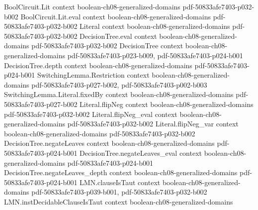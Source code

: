 \begin{theorem}
\label{BooleanAnalysis.fourier_coeff_chi}
\leanok
{}
\proofstep
  {BoolCircuit.Lit}
  {context}
  {boolean-ch08-generalized-domains}
  {pdf-50833afe7403-p032-b002}
\proofstep
  {BoolCircuit.Lit.eval}
  {context}
  {boolean-ch08-generalized-domains}
  {pdf-50833afe7403-p032-b002}
\proofstep
  {Literal}
  {context}
  {boolean-ch08-generalized-domains}
  {pdf-50833afe7403-p032-b002}
\proofstep
  {DecisionTree.eval}
  {context}
  {boolean-ch08-generalized-domains}
  {pdf-50833afe7403-p032-b002}
\proofstep
  {DecisionTree}
  {context}
  {boolean-ch08-generalized-domains}
  {pdf-50833afe7403-p023-b009,
    pdf-50833afe7403-p024-b001}
\proofstep
  {DecisionTree.depth}
  {context}
  {boolean-ch08-generalized-domains}
  {pdf-50833afe7403-p024-b001}
\proofstep
  {SwitchingLemma.Restriction}
  {context}
  {boolean-ch08-generalized-domains}
  {pdf-50833afe7403-p027-b002,
    pdf-50833afe7403-p002-b003}
\proofstep
  {SwitchingLemma.Literal.fixedBy}
  {context}
  {boolean-ch08-generalized-domains}
  {pdf-50833afe7403-p027-b002}
\proofstep
  {Literal.flipNeg}
  {context}
  {boolean-ch08-generalized-domains}
  {pdf-50833afe7403-p032-b002}
\proofstep
  {Literal.flipNeg_eval}
  {context}
  {boolean-ch08-generalized-domains}
  {pdf-50833afe7403-p032-b002}
\proofstep
  {Literal.flipNeg_var}
  {context}
  {boolean-ch08-generalized-domains}
  {pdf-50833afe7403-p032-b002}
\proofstep
  {DecisionTree.negateLeaves}
  {context}
  {boolean-ch08-generalized-domains}
  {pdf-50833afe7403-p024-b001}
\proofstep
  {DecisionTree.negateLeaves_eval}
  {context}
  {boolean-ch08-generalized-domains}
  {pdf-50833afe7403-p024-b001}
\proofstep
  {DecisionTree.negateLeaves_depth}
  {context}
  {boolean-ch08-generalized-domains}
  {pdf-50833afe7403-p024-b001}
\proofstep
  {LMN.clauseIsTaut}
  {context}
  {boolean-ch08-generalized-domains}
  {pdf-50833afe7403-p039-b001,
    pdf-50833afe7403-p032-b002}
\proofstep
  {LMN.instDecidableClauseIsTaut}
  {context}
  {boolean-ch08-generalized-domains}

\end{theorem}
